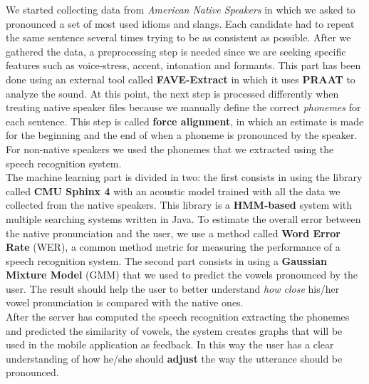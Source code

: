\noindent We started collecting data from \textit{American Native Speakers} in which we asked to pronounced a set of most used idioms and slangs. Each candidate had to repeat the same sentence several times trying to be as consistent as possible. After we gathered the data, a preprocessing step is needed since we are seeking specific features such as voice-stress, accent, intonation and formants.
This part has been done using an external tool called \textbf{FAVE-Extract} in which it uses \textbf{PRAAT}\cite{boersma2010p} to analyze the sound. At this point, the next step is processed differently when treating native speaker files because we manually define the correct \textit{phonemes} for each sentence. This step is called \textbf{force alignment}, in which an estimate is made for the beginning and the end of when a phoneme is pronounced by the speaker. For non-native speakers we used the phonemes that we extracted using the speech recognition system. \\

\noindent The machine learning part is divided in two: the first consists in using the library called \textbf{CMU Sphinx 4} with an acoustic model trained with all the data we collected from the native speakers. This library is a \textbf{HMM-based} system with multiple searching systems written in Java. To estimate the overall error between the native pronunciation and the user, we use a method called \textbf{Word Error Rate} (WER), a common method metric for measuring the performance of a speech recognition system.
The second part consists in using a \textbf{Gaussian Mixture Model} (GMM) that we used to predict the vowels pronounced by the user. The result should help the user to better understand \textit{how close} his/her vowel pronunciation is compared with the native ones. \\

\noindent After the server has computed the speech recognition extracting the phonemes and predicted the similarity of vowels, the system creates graphs that will be used in the mobile application as feedback. In this way the user has a clear understanding of how he/she should \textbf{adjust} the way the utterance should be pronounced. \\
